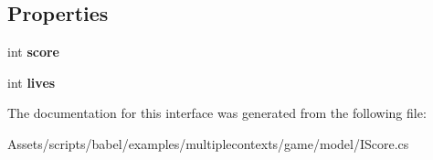 \subsection*{Properties}
\begin{DoxyCompactItemize}
\item 
\hypertarget{interfacebabel_1_1examples_1_1multiplecontexts_1_1game_1_1_i_score_acdbb5d2b6c36360e4a98c2173d66bf43}{int {\bfseries score}}\label{interfacebabel_1_1examples_1_1multiplecontexts_1_1game_1_1_i_score_acdbb5d2b6c36360e4a98c2173d66bf43}

\item 
\hypertarget{interfacebabel_1_1examples_1_1multiplecontexts_1_1game_1_1_i_score_aab83e9e17f98d681e0532731b58c8bad}{int {\bfseries lives}}\label{interfacebabel_1_1examples_1_1multiplecontexts_1_1game_1_1_i_score_aab83e9e17f98d681e0532731b58c8bad}

\end{DoxyCompactItemize}


The documentation for this interface was generated from the following file\-:\begin{DoxyCompactItemize}
\item 
Assets/scripts/babel/examples/multiplecontexts/game/model/I\-Score.\-cs\end{DoxyCompactItemize}
